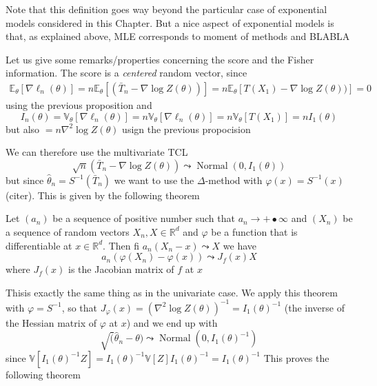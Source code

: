 \documentclass[
	fontsize=11pt, %
	twoside=false, %
	numbers=noenddot, %
]{kaobook}
\DeclareMathOperator{\nor}{Normal}
\newcommand{\E}{\mathbb E}
\newcommand{\R}{\mathbb R}
\newcommand{\var}{\mathbb V}
\newcommand{\wh}{\widehat}
\newcommand{\grad}{\nabla}
\newcommand{\gosto}{\leadsto}
\begin{document}
Note that this definition goes way beyond the particular case of exponential models considered in this Chapter.
But a nice aspect of exponential models is that, as explained above, MLE corresponds to moment of methods and BLABLA

Let us give some remarks/properties concerning the score and the Fisher information.
The score is a \emph{centered} random vector, since
\begin{align*}
	\E_\theta [\grad \ell_n(\theta)] = n \E_\theta[ (\bar T_n - \grad \log Z(\theta))] = n \E_\theta[ T(X_1) - \grad \log Z(\theta))]  = 0
\end{align*}
using the previous proposition and
\begin{equation*}
	I_n(\theta) = \var_\theta[\grad \ell_n(\theta)] = n \var_\theta[\grad \ell_n(\theta)] = n \var_\theta[T(X_1)] = n I_1(\theta)
\end{equation*}
but also $=n \grad^2 \log Z(\theta)$ usign the previous propocision

We can therefore use the multivariate TCL
\begin{equation*}
	\sqrt n (\bar T_n - \grad \log Z(\theta)) \gosto \nor(0, I_1(\theta))
\end{equation*}
but since $\wh \theta_n = S^{-1} (\bar T_n)$ we want to use the $\Delta$-method with $\varphi(x) = S^{-1}(x)$ (citer). 
This is given by the following theorem

\begin{theorem}
	Let $(a_n)$ be a sequence of positive number such that $a_n \rightarrow +•\infty$ and $(X_n)$ be a sequence of random vectors $X_n, X \in \R^d$ and $\varphi$ be a function that is differentiable at $x \in \R^d$.
	Then fi $a_n( X_n - x) \gosto X$ we have
	\begin{equation*}
		a_n (\varphi(X_n) - \varphi(x)) \gosto J_f(x) X
	\end{equation*}
	where $J_f(x)$ is the Jacobian matrix of $f$ at $x$
\end{theorem}
Thisis exactly the same thing as in the univariate case.
We apply this theorem with $\varphi = S^{-1}$, so that $J_\varphi(x) = (\grad^2 \log Z(\theta))^{-1} = I_1(\theta)^{-1}$ (the inverse of the Hessian matrix of $\varphi$ at $x$)
and we end up with
\begin{equation*}
	\sqrt (\wh \theta_n - \theta) \gosto \nor(0, I_1(\theta)^{-1})
\end{equation*}
since $\var[I_1(\theta)^{-1} Z] = I_1(\theta)^{-1} \var[ Z] I_1(\theta)^{-1} = I_1(\theta)^{-1}$
This proves the following theorem
\end{document}
